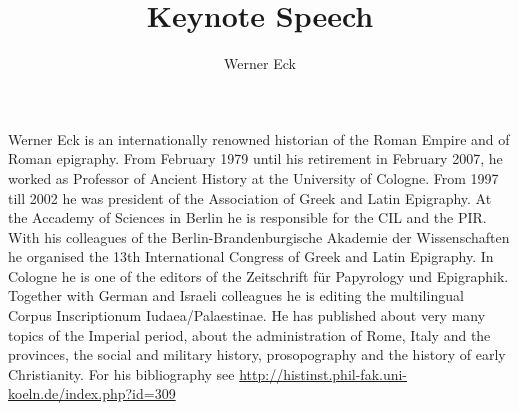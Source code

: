 \documentclass[amsthm,ebook]{saparticle}
\title{Keynote Speech}
\author[]{Werner Eck\corref{first}}
\begin{document}
\maketitle

Werner Eck is an internationally renowned historian of the Roman Empire and of Roman epigraphy. From February 1979 until his retirement in February 2007, he worked as Professor of Ancient History at the University of Cologne. From 1997 till 2002 he was president of the Association of Greek and Latin Epigraphy. At the Accademy of Sciences in Berlin he is responsible for the CIL and the PIR. With his colleagues of the Berlin-Brandenburgische Akademie der Wissenschaften he organised the 13th International Congress of Greek and Latin Epigraphy. In Cologne he is one of the editors of the Zeitschrift für Papyrology und Epigraphik. Together with German and Israeli colleagues he is editing the multilingual Corpus Inscriptionum Iudaea/Palaestinae. He has published about very many topics of the Imperial period, about the administration of Rome, Italy and the provinces, the social and military history, prosopography and the history of early Christianity. For his bibliography see \url{http://histinst.phil-fak.uni-koeln.de/index.php?id=309}
\end{document}
